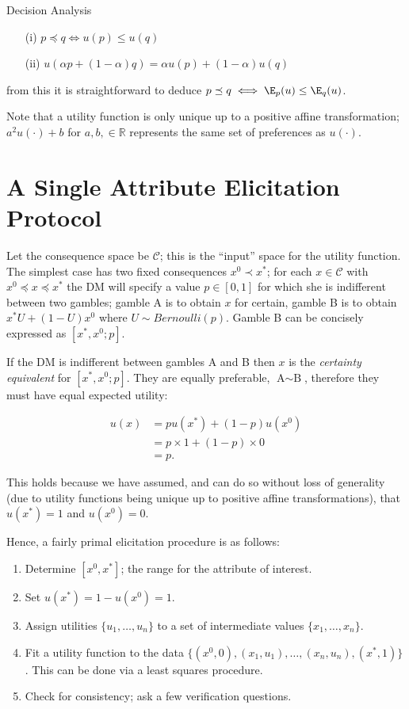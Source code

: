 \begin{chapter}{Decision Analysis \label{Ch:decision}}
\begin{enumerate}
\item[(i)] $p \preceq q \iff u(p) \leq u(q)$
\item[(ii)] $u(\alpha p + (1-\alpha) q) = \alpha u(p) + (1- \alpha)u(q)$
\end{enumerate}

from this it is straightforward to deduce $p \preceq q \iff \E_p(u) \leq \E_q(u)$.

Note that a utility function is only unique up to a positive affine transformation; $a^2u(\cdot) + b$ for $a, b, \in \mathbb{R}$ represents the same set of preferences as $u(\cdot)$.

\section{A Single Attribute Elicitation Protocol}

Let the consequence space be $\mathcal{C}$; this is the ``input'' space for the utility function. The simplest case has two fixed consequences $x^0 \prec x^*$; for each $x \in \mathcal{C}$ with $x^0 \preceq x \preceq x^*$ the DM will specify a value $p \in [0, 1]$ for which she is indifferent between two gambles; gamble A is to obtain $x$ for certain, gamble B is to obtain $x^* U + (1-U)x^0$ where $U \sim Bernoulli(p)$. Gamble B can be concisely expressed as $[x^*, x^0 ; p]$.

If the DM is indifferent between gambles A and B then $x$ is the \textit{certainty equivalent} for $[x^*, x^0; p]$. They are equally preferable, $\text{A} \sim \text{B}$, therefore they must have equal expected utility:

\begin{align}
	u(x) & = pu(x^*) + (1-p)u(x^0)\\
	     & = p \times 1 + (1-p) \times 0 \\
	     & = p.
\end{align}

This holds because we have assumed, and can do so without loss of generality (due to utility functions being unique up to positive affine transformations), that $u(x^*) = 1$ and $u(x^0) = 0$.

Hence, a fairly primal elicitation procedure is as follows:

\begin{enumerate}
	\item Determine $[x^0, x^*]$; the range for the attribute of interest.
	\item Set $u(x^*) = 1 - u(x^0) = 1$.
	\item Assign utilities $\{u_1, \ldots, u_n\}$ to a set of intermediate values $\{x_1, \ldots, x_n\}$.
	\item Fit a utility function to the data $\{(x^0, 0), (x_1, u_1), \ldots, (x_n, u_n), (x^*, 1) \}$. This can be done via a least squares procedure.
	\item Check for consistency; ask a few verification questions.
\end{enumerate}


\end{chapter}
